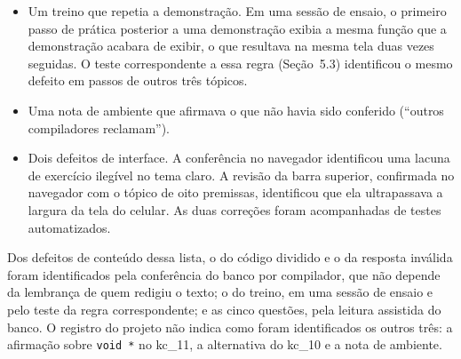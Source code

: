 \begin{itemize}
\item Um treino que repetia a demonstração. Em uma sessão de ensaio, o primeiro passo de prática posterior a uma demonstração exibia a mesma função que a demonstração acabara de exibir, o que resultava na mesma tela duas vezes seguidas. O teste correspondente a essa regra (Seção~5.3) identificou o mesmo defeito em passos de outros três tópicos.
\item Uma nota de ambiente que afirmava o que não havia sido conferido (``outros compiladores reclamam'').
\item Dois defeitos de interface. A conferência no navegador identificou uma lacuna de exercício ilegível no tema claro. A revisão da barra superior, confirmada no navegador com o tópico de oito premissas, identificou que ela ultrapassava a largura da tela do celular. As duas correções foram acompanhadas de testes automatizados.
\end{itemize}

Dos defeitos de conteúdo dessa lista, o do código dividido e o da resposta inválida foram identificados pela conferência do banco por compilador, que não depende da lembrança de quem redigiu o texto; o do treino, em uma sessão de ensaio e pelo teste da regra correspondente; e as cinco questões, pela leitura assistida do banco. O registro do projeto não indica como foram identificados os outros três: a afirmação sobre \texttt{void *} no kc\_11, a alternativa do kc\_10 e a nota de ambiente.
